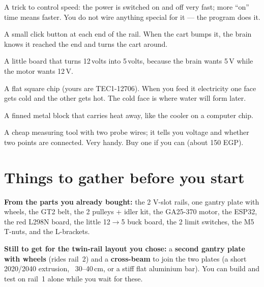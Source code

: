\documentclass[11pt,a4paper]{article}
\begin{document}
\begin{description}[leftmargin=2.2cm,style=nextline,itemsep=2pt]
  \item[PWM] A trick to control speed: the power is switched on and off very fast; more ``on'' time means
  faster. You do not wire anything special for it --- the program does it.
  \item[Limit switch] A small click button at each end of the rail. When the cart bumps it, the brain
  knows it reached the end and turns the cart around.
  \item[Buck converter (DC-DC step-down)] A little board that turns 12\,volts into 5\,volts, because the
  brain wants 5\,V while the motor wants 12\,V.
  \item[TEC / Peltier tile] A flat square chip (yours are TEC1-12706). When you feed it electricity one
  face gets cold and the other gets hot. The cold face is where water will form later.
  \item[Heatsink] A finned metal block that carries heat away, like the cooler on a computer chip.
  \item[Multimeter] A cheap measuring tool with two probe wires; it tells you voltage and whether two
  points are connected. Very handy. Buy one if you can (about 150 EGP).
\end{description}

\section{Things to gather before you start}

\textbf{From the parts you already bought:} the 2 V-slot rails, one gantry plate with wheels, the GT2
belt, the 2 pulleys + idler kit, the GA25-370 motor, the ESP32, the red L298N board, the little 12$\to$5
buck board, the 2 limit switches, the M5 T-nuts, and the L-brackets.

\textbf{Still to get for the twin-rail layout you chose:} a \textbf{second gantry plate with wheels} (rides
rail~2) and a \textbf{cross-beam} to join the two plates (a short 2020/2040 extrusion, ~30--40\,cm, or a
stiff flat aluminium bar). You can build and test on rail~1 alone while you wait for these.
\end{document}
